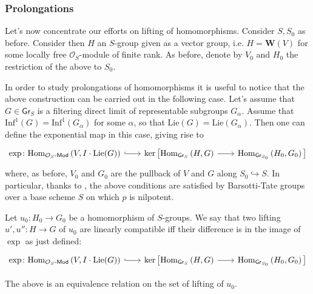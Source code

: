 \documentclass[../Main]{subfiles}
\begin{document}
\subsubsection{Prolongations}
Let's now concentrate our efforts on lifting of homomorphisms.
Consider $S, S_0$ as before.
Consider then $H$ an $S$-group given as a vector group,
i.e. $H = \mathbf{W}(V)$ for some locally free $\mathcal{O}_{ S }$-module
of finite rank.
As before, denote by $V_0$ and $H_0$ the restriction of the above to $S_0$.


\begin{rem}
	In order to study prolongations of homomorphisms it is useful to notice that
	the above construction can be carried out in the following case.
	Let's assume that $G \in \mathsf{Gr}_S$ is a filtering direct limit of
	representable subgroups $G_\alpha$.
	Assume that $\mathrm{Inf}^1(G) = \mathrm{Inf}^1(G_\alpha)$ for some $\alpha$,
	so that $\mathrm{Lie}(G) = \mathrm{Lie}(G_\alpha)$.
	Then one can define the exponential map in this case, giving rise to
	\begin{equation*}
	\begin{tikzcd}[row sep = 0ex, column sep = 2.0em
		,/tikz/column 1/.append style={anchor=base east}
		,/tikz/column 2/.append style={anchor=base west}]
		\exp\colon
		\mathrm{Hom}_{ \mathcal{O}_{ S }\text{-}\mathsf{Mod} }
		\left( V, I \cdot \mathrm{Lie}(G) \right)
		\arrow[r, "", hookrightarrow] &
		\ker \big[ 
		\mathrm{Hom}_{ \mathsf{Gr}_S } 
		\left( H, G \right)
		\arrow[r, "", rightarrow] &
		\mathrm{Hom}_{ \mathsf{Gr}_{S_0} }
		\left( H_0, G_0 \right)
		\big]
	\end{tikzcd}
	\end{equation*} 
	where, as before, $V_0$ and $G_0$ are the pullback of $V$ and $G$ 
	along $S_0 \hookrightarrow S$.
	In particular, thanks to \cite[Chapter II, Corollary 3.3.16]{Messing},
	the above conditions are satisfied by Barsotti-Tate
	groups over a base scheme $S$ on which $p$ is nilpotent.
\end{rem}


\begin{defn}
	Let $u_0\colon H_0 \to G_0$ be a homomorphism of $S$-groups.
	We say that two lifting $u', u''\colon H \to G$ of $u_0$
	are linearly compatible iff their difference is in the image
	of $\exp$ as just defined:
	\begin{equation*}
	\begin{tikzcd}[row sep = 0ex, column sep = 2.0em
		,/tikz/column 1/.append style={anchor=base east}
		,/tikz/column 2/.append style={anchor=base west}]
		\exp\colon
		\mathrm{Hom}_{ \mathcal{O}_{ S }\text{-}\mathsf{Mod} }
		\left( V, I \cdot \mathrm{Lie}(G) \right)
		\arrow[r, "", hookrightarrow] &
		\ker \big[ 
		\mathrm{Hom}_{ \mathsf{Gr}_S } 
		\left( H, G \right)
		\arrow[r, "", rightarrow] &
		\mathrm{Hom}_{ \mathsf{Gr}_{S_0} }
		\left( H_0, G_0 \right)
		\big]
	\end{tikzcd}
	\end{equation*} 
\end{defn}


\begin{rem}[]
	The above is an equivalence relation on the set of lifting of $u_0$.
\end{rem}
\end{document}
